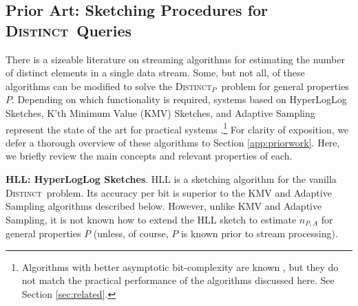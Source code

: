 \documentclass{article}
\newcommand{\eat}[1]{}
\newcommand{\distinctP}{\textsc{Distinct}$_P$}
\newcommand{\distinct}{\textsc{Distinct}}
\begin{document}
\eat{\medskip
\noindent \textbf{Additional Notation.} Throughout, we will use the following strategy for simplifying the
presentation of our results. Let $A_{\mathrm{raw}}$ be an arbitrary stream that is allowed to contain multiple
occurrences of the various identifiers. Let $A$ be the stream derived from $A_{\mathrm{raw}}$ by deleting all
occurrences of each label except for the one that would be encountered first during 
a linear scan through $A_{\mathrm{raw}}$. Then every sketching algorithm that we consider
produces exactly the same sketch and exactly the same estimate whether it is applied to
$A_{\mathrm{raw}}$ or to $A$. 
Therefore, without loss of generality, all of our proofs concerning the contents of sketches and the values
of estimates will be written in terms of the ``uniquified'' stream $A$. 
Finally, the notation $X^{n_A}$ will always refer to the sequence of hash values obtained by mapping 
a hash function $h$ over a length-$n_A$ uniquified stream $A$.}

\subsection{Prior Art: Sketching Procedures for \distinct\ Queries}
\label{sec:priorwork}
There is a sizeable literature on streaming algorithms for estimating the number of distinct elements in a single data stream. Some, but not all,
of these algorithms can be modified to solve the \distinctP\ problem for general properties $P$. 
Depending on which functionality is required, systems based on HyperLogLog Sketches, 
K'th Minimum Value (KMV) Sketches, and Adaptive Sampling represent the
state of the art for practical systems \cite{heule2013hll}.\footnote{Algorithms with better asymptotic bit-complexity are known \cite{kane2010optimal}, but they do not match the practical
performance of the algorithms discussed here. See Section \ref{sec:related}.}
For clarity of exposition, we defer a thorough overview of these algorithms to Section \ref{app:priorwork}. Here, we briefly review the main concepts
and relevant properties of each. 

\medskip
\noindent \textbf{HLL: HyperLogLog Sketches}. HLL is a sketching algorithm for the vanilla \distinct\ problem. Its accuracy per bit is superior to the KMV and Adaptive Sampling algorithms described below.
However, unlike KMV and Adaptive Sampling, it is not known how to extend the HLL sketch to estimate $n_{P, A}$ for general properties $P$ (unless, of course, $P$ is known prior to stream
processing). 
\end{document}

